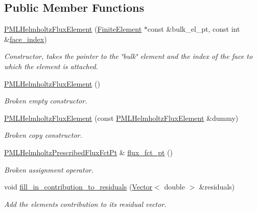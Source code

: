 \subsection*{Public Member Functions}
\begin{DoxyCompactItemize}
\item 
\hyperlink{classoomph_1_1PMLHelmholtzFluxElement_ab73fabdc7bc6124475798acd1158fc14}{P\+M\+L\+Helmholtz\+Flux\+Element} (\hyperlink{classoomph_1_1FiniteElement}{Finite\+Element} $\ast$const \&bulk\+\_\+el\+\_\+pt, const int \&\hyperlink{classoomph_1_1FaceElement_a478d577ac6db67ecc80f1f02ae3ab170}{face\+\_\+index})
\begin{DoxyCompactList}\small\item\em Constructor, takes the pointer to the \char`\"{}bulk\char`\"{} element and the index of the face to which the element is attached. \end{DoxyCompactList}\item 
\hyperlink{classoomph_1_1PMLHelmholtzFluxElement_acb256db0e635dc3f21a526d0feacbc32}{P\+M\+L\+Helmholtz\+Flux\+Element} ()
\begin{DoxyCompactList}\small\item\em Broken empty constructor. \end{DoxyCompactList}\item 
\hyperlink{classoomph_1_1PMLHelmholtzFluxElement_a9f38586456c3181bceff2de8d8b150fb}{P\+M\+L\+Helmholtz\+Flux\+Element} (const \hyperlink{classoomph_1_1PMLHelmholtzFluxElement}{P\+M\+L\+Helmholtz\+Flux\+Element} \&dummy)
\begin{DoxyCompactList}\small\item\em Broken copy constructor. \end{DoxyCompactList}\item 
\hyperlink{classoomph_1_1PMLHelmholtzFluxElement_af376593418510a6fcbc23cc13f3d6b22}{P\+M\+L\+Helmholtz\+Prescribed\+Flux\+Fct\+Pt} \& \hyperlink{classoomph_1_1PMLHelmholtzFluxElement_aa76da7cf9a297cb63cfc5bc564dc456d}{flux\+\_\+fct\+\_\+pt} ()
\begin{DoxyCompactList}\small\item\em Broken assignment operator. \end{DoxyCompactList}\item 
void \hyperlink{classoomph_1_1PMLHelmholtzFluxElement_ad35e8779e78d8a85b27dcc63cf590272}{fill\+\_\+in\+\_\+contribution\+\_\+to\+\_\+residuals} (\hyperlink{classoomph_1_1Vector}{Vector}$<$ double $>$ \&residuals)
\begin{DoxyCompactList}\small\item\em Add the element\textquotesingle{}s contribution to its residual vector. \end{DoxyCompactList}\item 

\end{DoxyCompactItemize}
